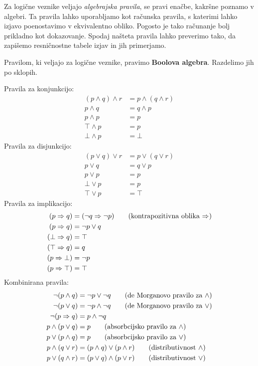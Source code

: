 Za logične veznike veljajo \emph{algebrajska pravila}, se pravi enačbe, kakršne poznamo v algebri. Ta pravila lahko uporabljamo kot računska pravila, s katerimi lahko izjavo poenostavimo v ekvivalentno obliko. Pogosto je tako računanje bolj prikladno kot dokazovanje. Spodaj našteta pravila lahko preverimo tako, da zapišemo resničnostne tabele izjav in jih primerjamo.

Pravilom, ki veljajo za logične veznike, pravimo \textbf{Boolova algebra}.
Razdelimo jih po sklopih.

Pravila za konjunkcijo:
%
\begin{align}
  (p \land q) \land r &= p \land (q \land r) \tag{asociativnost $\land$} \\
  p \land q &= q \land p \tag{komutativnost $\land$} \\
  p \land p &= p \tag{idempotentnost $\land$} \\
  \top \land p &= p \tag{$\top$ je nevtralen za $\land$} \\
  \bot \land p &= \bot \tag{$\bot$ absorbira $\land$}
\end{align}
%
Pravila za disjunkcijo:
%
\begin{align}
  (p \lor q) \lor r &= p \lor (q \lor r) \tag{asociativnost $\lor$} \\
  p \lor q &= q \lor p \tag{komutativnost $\lor$} \\
  p \lor p &= p \tag{idempotentnost $\lor$} \\
  \bot \lor p &= p \tag{$\bot$ je nevtralen za $\lor$} \\
  \top \lor p &= \top \tag{$\top$ absorbira $\lor$}
\end{align}
%
Pravila za implikacijo:
%
\begin{align}
  (p \lthen q) &= (\neg q \lthen \neg p) \tag{kontrapozitivna oblika $\lthen$}\\
  (p \lthen q) &= \neg p \lor q \notag \\
  (\bot \lthen q) &= \top \notag \\
  (\top \lthen q) &= q \notag \\
  (p \lthen \bot) &= \neg p \notag \\
  (p \lthen \top) &= \top \notag
\end{align}
%
Kombinirana pravila:
%
\begin{align}
  \neg(p \land q) &= \neg p \lor \neg q \tag{de Morganovo pravilo za $\land$} \\
  \neg(p \lor q) &= \neg p \land \neg q \tag{de Morganovo pravilo za $\lor$} \\
  \neg(p \Rightarrow q) &= p \land \neg q \notag \\
  p \land (p \lor q) &= p \tag{absorbcijsko pravilo za $\land$}\\
  p \lor (p \land q) &= p \tag{absorbcijsko pravilo za $\lor$} \\
  p \land (q \lor r) &= (p \land q) \lor (p \land r) \tag{distributivnost $\land$}\\
  p \lor (q \land r) &= (p \lor q) \land (p \lor r) \tag{distributivnost $\lor$}
\end{align}
